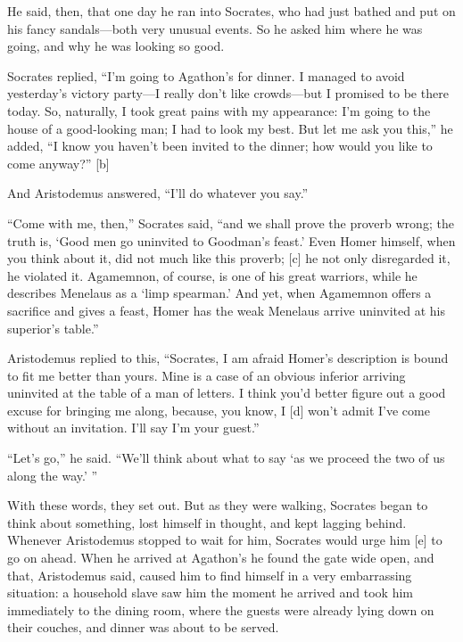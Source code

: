 He said, then, that one day he ran into Socrates, who had just bathed
and put on his fancy sandals---both very unusual events. So he asked him
where he was going, and why he was looking so good.

Socrates replied, “I'm going to Agathon's for dinner. I managed to avoid
yesterday's victory party---I really don't like crowds---but I promised
to be there today. So, naturally, I took great pains with my appearance:
I'm going to the house of a good-looking man; I had to look my best. But
let me ask you this,” he added, “I know you haven't been invited to the
dinner; how would you like to come anyway?” {[}b{]}

And Aristodemus answered, “I'll do whatever you say.”

“Come with me, then,” Socrates said, “and we shall prove the proverb
wrong; the truth is, ‘Good men go uninvited to Goodman's
feast.' Even Homer
himself, when you think about it, did not much like this proverb;
{[}c{]} he not only disregarded it, he violated it. Agamemnon, of
course, is one of his great warriors, while he describes Menelaus as a
‘limp spearman.' And yet, when Agamemnon offers a sacrifice and gives a
feast, Homer has the weak Menelaus arrive uninvited at his superior's
table.”

Aristodemus replied to this, “Socrates, I am afraid Homer's description
is bound to fit me better than yours. Mine is a case of an obvious
inferior arriving uninvited at the table of a man of letters. I think
you'd better figure out a good excuse for bringing me along, because,
you know, I {[}d{]} won't admit I've come without an invitation. I'll
say I'm your guest.”

“Let's go,” he said. “We'll think about what to say ‘as we proceed the
two of us along the way.'
”

With these words, they set out. But as they were walking, Socrates began
to think about something, lost himself in thought, and kept lagging
behind. Whenever Aristodemus stopped to wait for him, Socrates would
urge him {[}e{]} to go on ahead. When he arrived at Agathon's he found
the gate wide open, and that, Aristodemus said, caused him to find
himself in a very embarrassing situation: a household slave saw him the
moment he arrived and took him immediately to the dining room, where the
guests were already lying down on their couches, and dinner was about to
be served.

